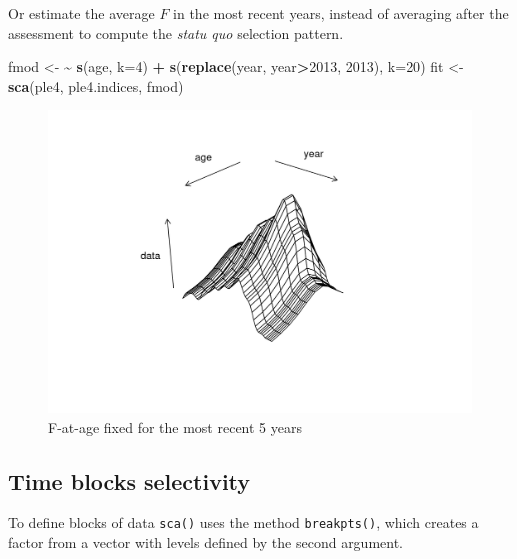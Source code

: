 \documentclass[
]{book}
\newenvironment{Shaded}{\begin{snugshade}}{\end{snugshade}}
\newcommand{\AttributeTok}[1]{\textcolor[rgb]{0.13,0.29,0.53}{#1}}
\newcommand{\DecValTok}[1]{\textcolor[rgb]{0.00,0.00,0.81}{#1}}
\newcommand{\ErrorTok}[1]{\textcolor[rgb]{0.64,0.00,0.00}{\textbf{#1}}}
\newcommand{\FunctionTok}[1]{\textcolor[rgb]{0.13,0.29,0.53}{\textbf{#1}}}
\newcommand{\NormalTok}[1]{#1}
\newcommand{\OtherTok}[1]{\textcolor[rgb]{0.56,0.35,0.01}{#1}}
\newcommand{\SpecialCharTok}[1]{\textcolor[rgb]{0.81,0.36,0.00}{\textbf{#1}}}
\begin{document}
Or estimate the average \(F\) in the most recent years, instead of averaging after the assessment to compute the \emph{statu quo} selection pattern.

\begin{Shaded}
\begin{Highlighting}[]
\NormalTok{fmod }\OtherTok{\textless{}{-}} \ErrorTok{\textasciitilde{}} \FunctionTok{s}\NormalTok{(age, }\AttributeTok{k=}\DecValTok{4}\NormalTok{) }\SpecialCharTok{+} \FunctionTok{s}\NormalTok{(}\FunctionTok{replace}\NormalTok{(year, year}\SpecialCharTok{\textgreater{}}\DecValTok{2013}\NormalTok{, }\DecValTok{2013}\NormalTok{), }\AttributeTok{k=}\DecValTok{20}\NormalTok{)}
\NormalTok{fit }\OtherTok{\textless{}{-}} \FunctionTok{sca}\NormalTok{(ple4, ple4.indices, fmod)}
\end{Highlighting}
\end{Shaded}

\begin{figure}
\centering
\includegraphics{_bookdown_files/_main_files/figure-html/ctsselyear-1.png}
\caption{\label{fig:ctsselyear}F-at-age fixed for the most recent 5 years}
\end{figure}

\hypertarget{time-blocks-selectivity}{%
\subsection{Time blocks selectivity}\label{time-blocks-selectivity}}

To define blocks of data \texttt{sca()} uses the method \texttt{breakpts()}, which creates a factor from a vector with levels defined by the second argument.
\end{document}
